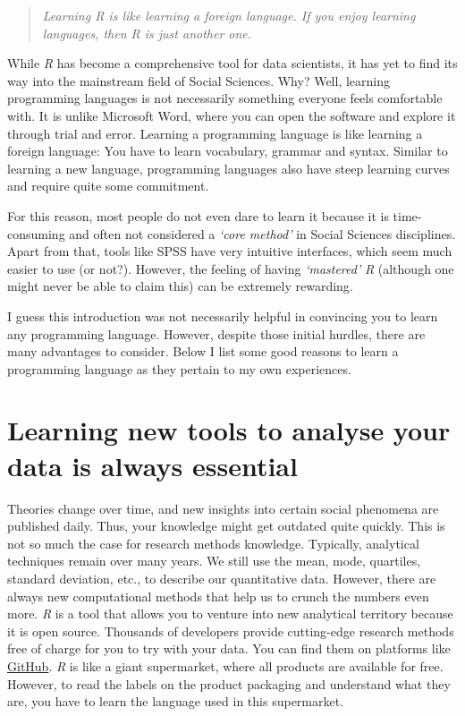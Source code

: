 \documentclass[
  letterpaper,
  DIV=11,
  numbers=noendperiod]{scrreprt}
\begin{document}
\begin{quote}
\emph{Learning R is like learning a foreign language. If you enjoy
learning languages, then R is just another one.}
\end{quote}

While \emph{R} has become a comprehensive tool for data scientists, it
has yet to find its way into the mainstream field of Social Sciences.
Why? Well, learning programming languages is not necessarily something
everyone feels comfortable with. It is unlike Microsoft Word, where you
can open the software and explore it through trial and error. Learning a
programming language is like learning a foreign language: You have to
learn vocabulary, grammar and syntax. Similar to learning a new
language, programming languages also have steep learning curves and
require quite some commitment.

For this reason, most people do not even dare to learn it because it is
time-consuming and often not considered a \emph{`core method'} in Social
Sciences disciplines. Apart from that, tools like SPSS have very
intuitive interfaces, which seem much easier to use (or not?). However,
the feeling of having \emph{`mastered'} \emph{R} (although one might
never be able to claim this) can be extremely rewarding.

I guess this introduction was not necessarily helpful in convincing you
to learn any programming language. However, despite those initial
hurdles, there are many advantages to consider. Below I list some good
reasons to learn a programming language as they pertain to my own
experiences.

\section{Learning new tools to analyse your data is always
essential}\label{sec-learning-new-tools-to-analyse-your-data-is-always-essential}

Theories change over time, and new insights into certain social
phenomena are published daily. Thus, your knowledge might get outdated
quite quickly. This is not so much the case for research methods
knowledge. Typically, analytical techniques remain over many years. We
still use the mean, mode, quartiles, standard deviation, etc., to
describe our quantitative data. However, there are always new
computational methods that help us to crunch the numbers even more.
\emph{R} is a tool that allows you to venture into new analytical
territory because it is open source. Thousands of developers provide
cutting-edge research methods free of charge for you to try with your
data. You can find them on platforms like
\href{https://github.com}{GitHub}. \emph{R} is like a giant supermarket,
where all products are available for free. However, to read the labels
on the product packaging and understand what they are, you have to learn
the language used in this supermarket.
\end{document}
